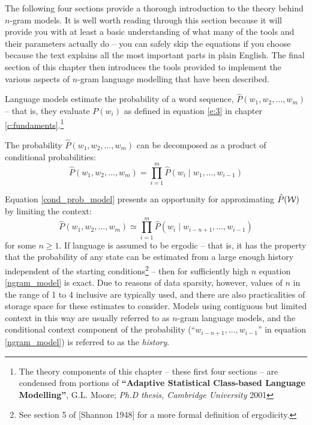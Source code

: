 The following four sections provide a thorough introduction to the
theory behind $n$-gram models.  It is well worth reading through this
section because it will provide you with at least a basic
understanding of what many of the tools and their parameters actually
do -- you can safely skip the equations if you choose because the text
explains all the most important parts in plain English.  The final
section of this chapter then introduces the tools provided to
implement the various aspects of $n$-gram language modelling that have
been described.


Language models estimate the probability of a word sequence, $\hat
P(w_1, w_2, \ldots, w_m)$ -- that is, they evaluate $P(w_i)$ as defined in equation
\ref{e:3} in chapter \ref{c:fundaments}.\footnote{The theory components of this chapter --
these first four sections -- are condensed from portions of
{\textbf{``Adaptive Statistical Class-based Language Modelling''},
G.L. Moore; \textit{Ph.D thesis, Cambridge University} 2001}}

The probability $\hat P(w_1, w_2, \ldots, w_m)$ can be decomposed as a
product of conditional probabilities:
\begin{equation}
\hat P(w_1, w_2, \ldots, w_m) = \prod_{i=1}^{m} \hat P(w_i \;|\; w_1,
\ldots, w_{i-1})\label{cond_prob_model}
\end{equation}


Equation \ref{cond_prob_model} presents an opportunity for
approximating $\hat{P}(\cal{W})$ by limiting the context:
\begin{equation}
\hat P(w_1, w_2, \ldots, w_m) \simeq \prod_{i=1}^{m} \hat P(w_i \;|\; w_{i-n+1},
\ldots, w_{i-1})\label{ngram_model}
\end{equation}
for some $n \geqslant 1$. If language is assumed to be ergodic -- that
is, it has the property that the probability of any state can be
estimated from a large enough history independent of the starting
conditions\footnote{See section 5 of [Shannon 1948]
for a more formal definition of ergodicity.} -- then for sufficiently high $n$ equation
\ref{ngram_model} is exact.  Due to reasons of data sparsity, however,
values of $n$ in the range of 1 to 4 inclusive are typically used, and
there are also practicalities of storage space for these estimates to
consider.  Models using contiguous but limited context in this way are
usually referred to as $n$-gram language models, and the conditional
context component of the probability (``$w_{i-n+1}, \ldots, w_{i-1}$''
in equation \ref{ngram_model}) is referred to as the {\it history}.

